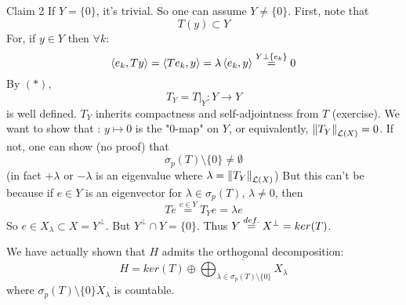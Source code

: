 \begin{pf}{Claim 2}{}
	If $Y=\{0\}$, it's trivial. So one can assume $Y\neq\{0\}$. First, note that
	\begin{equation}T(y)\subset Y\tag{$*$}\end{equation}
	For, if $y\in Y$ then $\forall k$:
	\[\left<{e_k},{Ty}\right>=\left<{Te_k},{y}\right>=\lambda\left<{e_k},{y}\right>\stackrel{Y\perp\{e_k\}}{=}0\]
	By $(*)$,
	\[T_Y=T|_Y:Y\to Y\] is well defined. $T_Y$ inherits compactness and self-adjointness from $T$ (exercise). We want to show that : $y\mapsto0 $ is the  "0-map" on $Y$, or equivalently, $\left\|{T_Y}\right\|_{\mathcal{L}(X)}=0$. If not, one can show (no proof) that
	\[\sigma_p(T)\setminus\{0\}\neq\emptyset\]
	(in fact $+\lambda$ or $-\lambda$ is an eigenvalue where $\lambda=\left\|{T_Y}\right\|_{\mathcal{L}(X)}$) But this can't be because if $e\in Y$ is an eigenvector for $\lambda\in\sigma_p(T)$, $\lambda\neq 0$, then
	\[Te\stackrel{e\in Y}{=}T_Y e=\lambda e\]
	So $e\in X_\lambda\subset X=Y^\perp$. But $Y^\perp\cap Y=\{0\}$. Thus $Y\stackrel{def.}{=} X^\perp=ker(T)$.
\end{pf}

\begin{remark}
	We have actually shown that $H$ admits the orthogonal decomposition:
	\[H=ker(T)\oplus
		\overline{\bigoplus_{\lambda\in\sigma_p(T)\setminus\{0\}}X_\lambda}
	\]
	where $\sigma_p(T)\setminus\{0\}X_\lambda$ is countable.
\end{remark}
